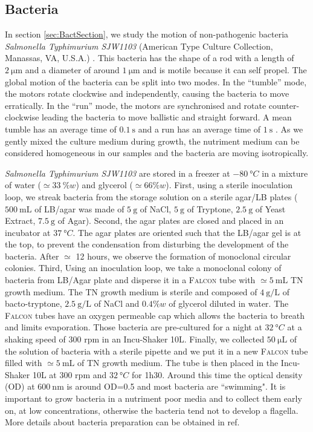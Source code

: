 \documentclass[prb,reprint,amsmath,amssymb]{revtex4-1}
\newcommand{\tg}[1]{{\color{magenta}#1}} %
\begin{document}
\subsection{Bacteria}
In section \ref{sec:BactSection}, we study the motion of non-pathogenic bacteria \tg{\textit{Salmonella Typhimurium SJW1103}  (American Type Culture Collection, Manassas, VA, U.S.A.)} \citep{21_fabrega2013salmonella}. \tg{This bacteria has the shape of a rod with a length of $\SI{2}{\micro\meter}$ and a diameter of around $\SI{1}{\micro\meter}$ and is motile because it can self propel. The global motion of the bacteria can be split into two modes. In the ``tumble'' mode, the motors rotate clockwise and independently, causing the bacteria to move erratically. In the ``run'' mode, the motors are synchronised and rotate counter-clockwise leading the bacteria to move ballistic and straight forward. A mean tumble has an average time of $\SI{0.1}{\second}$ and a run has an average time of $\SI{1}{\second}$ \citep{5_berg2000motile}. As we gently mixed the culture medium during growth, the nutriment medium can be considered homogeneous in our samples and the bacteria are moving isotropically.}

\textit{Salmonella Typhimurium SJW1103}  are stored in a freezer at $\SI{-80}{\degree C}$ in a mixture of water ($\simeq \SI{33}{\%} w$) and glycerol ($\simeq 66\% w$). First, using a sterile inoculation loop, we streak bacteria from the storage solution on a sterile agar/LB plates  ($\SI{500}{\milli\liter}$ of LB/agar was made of $\SI{5}{\gram}$ of NaCl, $\SI{5}{\gram}$ of Tryptone, $\SI{2.5}{\gram}$ of Yeast Extract, $\SI{7.5}{\gram}$ of Agar). Second, the agar plates are closed and placed in an incubator at $\SI{37}{\degree C}$. The agar plates are oriented such that the LB/agar gel is at the top, to prevent the condensation from disturbing the development of the bacteria. After $\simeq$ 12 hours, we observe the formation of monoclonal circular colonies. Third, Using an inoculation loop, we take a monoclonal colony of bacteria from LB/Agar plate and disperse it in a \textsc{Falcon} tube with $\simeq \SI{5}{\milli\liter}$ TN growth medium. The TN growth medium is sterile and composed of $\SI{4}{\gram\per\liter}$ of bacto-tryptone, $\SI{2.5}{\gram\per\liter}$ of NaCl and $0.4\% w$ of glycerol diluted in water. The \textsc{Falcon} tubes have an oxygen permeable cap which allows the bacteria to breath and limits evaporation. Those bacteria are pre-cultured for a night at $\SI{32}{\degree C}$ \tg{at a shaking speed of} 300 rpm in an Incu-Shaker 10L. Finally, we collected $\SI{50}{\micro\liter}$ of the solution of bacteria with a sterile pipette and we put it in a new \textsc{Falcon} tube filled with $\simeq \SI{5}{\milli\liter}$ of TN growth medium. The tube is then placed in the Incu-Shaker 10L at 300 rpm and $\SI{32}{\degree C}$ for 1h30. Around this time the optical density (OD) at $\SI{600}{\nano\meter}$ is around OD=0.5 and most bacteria are ``swimming". It is important to grow bacteria in a nutriment poor media and to collect them early on, at low concentrations, otherwise the bacteria tend not to develop a flagella. More details about bacteria preparation can be obtained in ref\cite{Schwarz2015, ajp2010hagen, XXX}.
\end{document}

